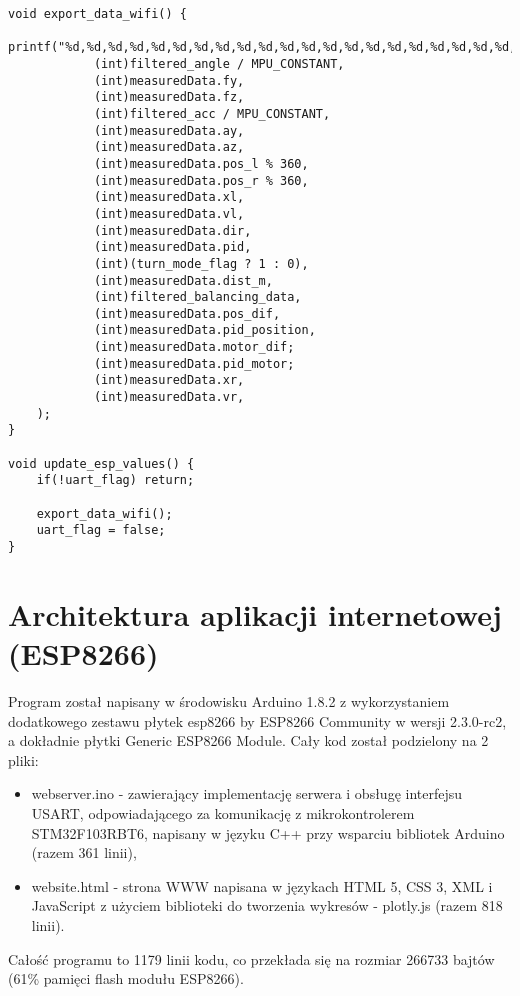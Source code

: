 \documentclass[a4paper,12pt,twoside,openany]{report}
\begin{document}
\begin{lstlisting}[style=customc]
void export_data_wifi() {
	printf("%d,%d,%d,%d,%d,%d,%d,%d,%d,%d,%d,%d,%d,%d,%d,%d,%d,%d,%d,%d,%d,%d,;\r\n",
			(int)filtered_angle / MPU_CONSTANT,
			(int)measuredData.fy,
		    (int)measuredData.fz,
			(int)filtered_acc / MPU_CONSTANT,
			(int)measuredData.ay,
			(int)measuredData.az,
			(int)measuredData.pos_l % 360,
			(int)measuredData.pos_r % 360,
			(int)measuredData.xl,
			(int)measuredData.vl,
			(int)measuredData.dir,
			(int)measuredData.pid,
			(int)(turn_mode_flag ? 1 : 0),
			(int)measuredData.dist_m,
			(int)filtered_balancing_data,
			(int)measuredData.pos_dif,
			(int)measuredData.pid_position,
			(int)measuredData.motor_dif;
			(int)measuredData.pid_motor;
			(int)measuredData.xr,
			(int)measuredData.vr,
	);
}

void update_esp_values() {
	if(!uart_flag) return;
	
	export_data_wifi();
	uart_flag = false;
}

\end{lstlisting}


\section{Architektura aplikacji internetowej (ESP8266)}

Program został napisany w środowisku Arduino 1.8.2 z wykorzystaniem dodatkowego zestawu płytek esp8266 by ESP8266 Community w wersji 2.3.0-rc2, a dokładnie płytki Generic ESP8266 Module. Cały kod został podzielony na 2 pliki:
\begin{itemize}
\item webserver.ino - zawierający implementację serwera i obsługę interfejsu USART, odpowiadającego za komunikację z mikrokontrolerem \\STM32F103RBT6, napisany w języku C++ przy wsparciu bibliotek Arduino (razem 361 linii),
\item website.html - strona WWW napisana w językach HTML 5, CSS 3, XML i JavaScript z użyciem biblioteki do tworzenia wykresów - plotly.js (razem 818 linii).
\end{itemize}
Całość programu to 1179 linii kodu, co przekłada się na rozmiar 266733 bajtów (61\% pamięci flash modułu ESP8266).
\end{document}

